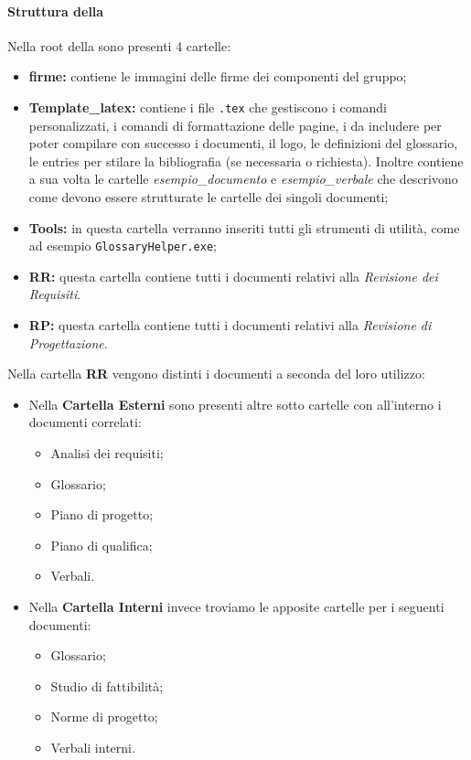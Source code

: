 \paragraph{Struttura della }%
Nella root della  sono presenti 4 cartelle: 
\begin{itemize}
    \item \textbf{firme:} contiene le immagini delle firme dei componenti del gruppo;
    \item \textbf{Template\_{}latex:} contiene i file \texttt{.tex} che gestiscono i comandi personalizzati, i comandi di formattazione delle pagine, i  da includere per poter compilare con successo i documenti, il logo, le definizioni del glossario, le entries per stilare la bibliografia (se necessaria o richiesta). Inoltre contiene a sua volta le cartelle \emph{esempio\_{}documento} e \emph{esempio\_{}verbale} che descrivono come devono essere strutturate le cartelle dei singoli documenti;
    \item \textbf{Tools:} in questa cartella verranno inseriti tutti gli strumenti di utilità, come ad esempio \texttt{GlossaryHelper.exe};
    \item \textbf{RR:} questa cartella contiene tutti i documenti relativi alla \textit{Revisione dei Requisiti}.
    \item \textbf{RP:} questa cartella contiene tutti i documenti relativi alla \textit{Revisione di Progettazione}.
\end{itemize}
Nella cartella \textbf{RR} vengono distinti i documenti a seconda del loro utilizzo:
\begin{itemize}
    \item Nella \textbf{Cartella Esterni} sono presenti altre sotto cartelle con all'interno i documenti correlati:
    \begin{itemize}
        \item Analisi dei requisiti;
        \item Glossario;
        \item Piano di progetto;
        \item Piano di qualifica;
        \item Verbali.
    \end{itemize}
    \item Nella \textbf{Cartella Interni} invece troviamo le apposite cartelle per i seguenti documenti:
    \begin{itemize}
        \item Glossario;
        \item Studio di fattibilità; 
        \item Norme di progetto;
        \item Verbali interni.
    \end{itemize}
\end{itemize}
